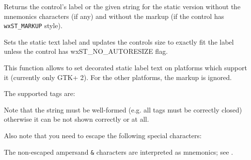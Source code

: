 \label{wxstatictextgetlabeltext}


Returns the control's label or the given  string for the static
version without the mnemonics characters (if any) and without the markup
(if the control has \texttt{wxST_MARKUP} style).



\label{wxstatictextsetlabel}


Sets the static text label and updates the controls size to exactly fit the
label unless the control has wxST\_NO\_AUTORESIZE flag.

This function allows to set decorated static label text on platforms which
support it (currently only GTK+ 2). For the other platforms, the markup is
ignored.

The supported tags are:

\twocolwidtha{5cm}
\begin{twocollist}\itemsep=0pt
\end{twocollist}

Note that the string must be well-formed (e.g. all tags must be correctly closed)
otherwise it can be not shown correctly or at all.

Also note that you need to escape the following special characters:

\twocolwidtha{5cm}
\begin{twocollist}\itemsep=0pt
\end{twocollist}

The non-escaped ampersand \texttt{&} characters are interpreted as
mnemonics; see .


